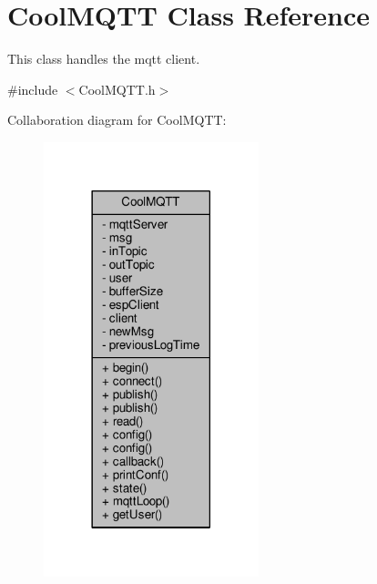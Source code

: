 \hypertarget{classCoolMQTT}{}\section{Cool\+M\+Q\+TT Class Reference}
\label{classCoolMQTT}


This class handles the mqtt client.  




{\ttfamily \#include $<$Cool\+M\+Q\+T\+T.\+h$>$}



Collaboration diagram for Cool\+M\+Q\+TT\+:
\nopagebreak
\begin{figure}[H]
\begin{center}
\leavevmode
\includegraphics[width=177pt]{classCoolMQTT__coll__graph}
\end{center}
\end{figure}
